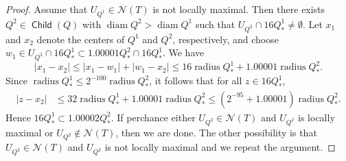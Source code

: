 \documentclass[12pt]{amsart}
\numberwithin{equation}{section}
\theoremstyle{plain}
\theoremstyle{definition}
\newcommand{\radius}{\mathop\mathrm{radius}\nolimits}
\newcommand{\diam}{\mathop\mathrm{diam}\nolimits}
\newcommand{\Child}{\mathop\mathsf{Child}\nolimits}
\numberwithin{figure}{section}
\begin{document}
\begin{proof} Assume that $U_{Q^1}\in\mathcal{N}(T)$ is not locally maximal. Then there exists $Q^2\in\Child(Q)$ with $\diam Q^2>\diam Q^1$ such that $U_{Q^2}\cap 16Q^1_*\neq\emptyset$. Let $x_1$ and $x_2$ denote the centers of $Q^1$ and $Q^2$, respectively, and choose $w_1\in U_{Q^2}\cap 16Q^1_*\subset 1.00001Q^2_*\cap 16Q^1_*$. We have \begin{equation}\label{nlm1}
|x_1-x_2| \leq |x_1-w_1|+|w_1-x_2| \leq 16\radius Q^1_*+1.00001\radius Q^2_*.\end{equation} Since $\radius Q^1_*\leq 2^{-100}\radius Q^2_*$, it follows that for all $z\in 16Q^1_*$, \begin{align*} |z-x_2| & \leq 32\radius Q^1_*+1.00001\radius Q^2_*\leq (2^{-95}+1.00001)\radius Q^2_*.\end{align*} Hence $16Q^1_*\subset 1.00002Q^2_*$. If perchance either $U_{Q^2}\in\mathcal{N}(T)$ and $U_{Q^2}$ is locally maximal or $U_{Q^2}\not\in\mathcal{N}(T)$, then we are done. The other possibility is that $U_{Q^2}\in\mathcal{N}(T)$ and $U_{Q^2}$ is not locally maximal and we repeat the argument.


\end{proof}
\end{document}
